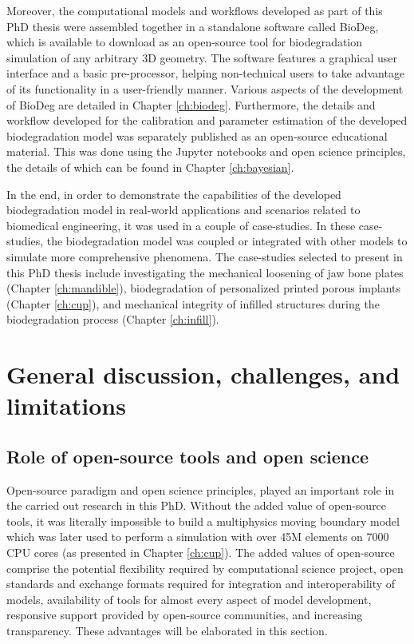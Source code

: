 Moreover, the computational models and workflows developed as part of this PhD thesis were assembled together in a standalone software called BioDeg, which is available to download as an open-source tool for biodegradation simulation of any arbitrary 3D geometry. The software features a graphical user interface and a basic pre-processor, helping non-technical users to take advantage of its functionality in a user-friendly manner. Various aspects of the development of BioDeg are detailed in Chapter \ref{ch:biodeg}. Furthermore, the details and workflow developed for the calibration and parameter estimation of the developed biodegradation model was separately published as an open-source educational material. This was done using the Jupyter notebooks and open science principles, the details of which can be found in Chapter \ref{ch:bayesian}.

In the end, in order to demonstrate the capabilities of the developed biodegradation model in real-world applications and scenarios related to biomedical engineering, it was used in a couple of case-studies. In these case-studies, the biodegradation model was coupled or integrated with other models to simulate more comprehensive phenomena. The case-studies selected to present in this PhD thesis include investigating the mechanical loosening of jaw bone plates (Chapter \ref{ch:mandible}), biodegradation of personalized printed porous implants (Chapter \ref{ch:cup}), and mechanical integrity of infilled structures during the biodegradation process (Chapter \ref{ch:infill}).



\section{General discussion, challenges, and limitations}

\subsection{Role of open-source tools and open science} \label{sec:open_source}


Open-source paradigm and open science principles, played an important role in the carried out research in this PhD. Without the added value of open-source tools, it was literally impossible to build a multiphysics moving boundary model which was later used to perform a simulation with over 45M elements on 7000 CPU cores (as presented in Chapter \ref{ch:cup}). The added values of open-source comprise the potential flexibility required by computational science project, open standards and exchange formats required for integration and interoperability of models, availability of tools for almost every aspect of model development, responsive support provided by open-source communities, and increasing transparency. These advantages will be elaborated in this section.

